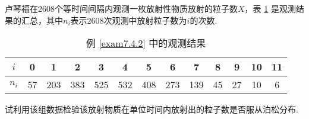 \begin{example}\label{exam7.4.2}
  卢琴福在2608个等时间间隔内观测一枚放射性物质放射的粒子数$X$，表 \ref{tab7.4.1} 是观测结果的汇总，其中$n_i$表示2608次观测中放射粒子数为$i$的次数.
  \begin{table}[!ht]
    \centering
    \caption{例 \ref{exam7.4.2} 中的观测结果}\label{tab7.4.1}
    \begin{tabular}{c|*{12}{c}}
      \toprule
        $i$ & 0 & 1 & 2 & 3 & 4 & 5 & 6 & 7 & 8 & 9 & 10 & 11 \\
        \midrule
        $n_i$ & 57 & 203 & 383 & 525 & 532 & 408 & 273 & 139 & 45 & 27 & 10 & 6 \\
        \bottomrule
    \end{tabular}
  \end{table}
  试利用该组数据检验该放射物质在单位时间内放射出的粒子数是否服从泊松分布.
\end{example}
